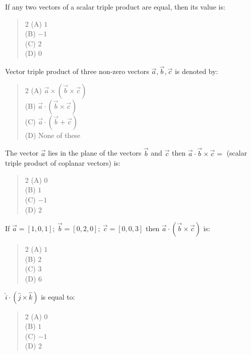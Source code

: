 \documentclass[11pt,a4paper]{article}
\begin{document}
\begin{mcqlist}
\item If any two vectors of a scalar triple product are equal, then its value is:
\begin{quote}\begin{multicols}{2}
\noindent (A) $1$ \\
(B) $-1$ \\
(C) $2$ \\
(D) $0$
\end{multicols}\end{quote}

\item Vector triple product of three non-zero vectors $\vec{a},\vec{b},\vec{c}$ is denoted by:
\begin{quote}\begin{multicols}{2}
\noindent (A) $\vec{a}\times(\vec{b}\times\vec{c})$ \\
(B) $\vec{a}\cdot(\vec{b}\times\vec{c})$ \\
(C) $\vec{a}\cdot(\vec{b}+\vec{c})$ \\
(D) None of these
\end{multicols}\end{quote}

\item The vector $\vec{a}$ lies in the plane of the vectors $\vec{b}$ and $\vec{c}$ then $\vec{a}\cdot\vec{b}\times\vec{c}=$ (scalar triple product of coplanar vectors) is:
\begin{quote}\begin{multicols}{2}
\noindent (A) $0$ \\
(B) $1$ \\
(C) $-1$ \\
(D) $2$
\end{multicols}\end{quote}

\item If $\vec{a}=[1,0,1];\ \vec{b}=[0,2,0];\ \vec{c}=[0,0,3]$ then $\vec{a}\cdot(\vec{b}\times\vec{c})$ is:
\begin{quote}\begin{multicols}{2}
\noindent (A) $1$ \\
(B) $2$ \\
(C) $3$ \\
(D) $6$
\end{multicols}\end{quote}

\item $\hat{i}\cdot(\hat{j}\times\hat{k})$ is equal to:
\begin{quote}\begin{multicols}{2}
\noindent (A) $0$ \\
(B) $1$ \\
(C) $-1$ \\
(D) $2$
\end{multicols}\end{quote}


\end{mcqlist}
\end{document}
